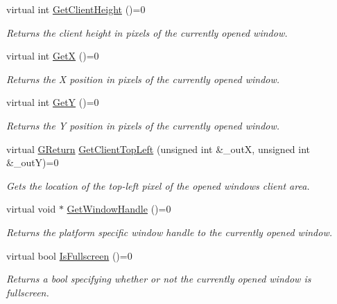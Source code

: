 \begin{DoxyCompactItemize}
virtual int \hyperlink{classGW_1_1SYSTEM_1_1GWindow_ac0a08847a67fbb588f6a851007f465f0}{Get\+Client\+Height} ()=0
\begin{DoxyCompactList}\small\item\em Returns the client height in pixels of the currently opened window. \end{DoxyCompactList}\item 
virtual int \hyperlink{classGW_1_1SYSTEM_1_1GWindow_a085fd92d1a4f5cb131ca405dc69d28ea}{GetX} ()=0
\begin{DoxyCompactList}\small\item\em Returns the X position in pixels of the currently opened window. \end{DoxyCompactList}\item 
virtual int \hyperlink{classGW_1_1SYSTEM_1_1GWindow_a37525397599eb9fc9fced0fe3a69fc04}{GetY} ()=0
\begin{DoxyCompactList}\small\item\em Returns the Y position in pixels of the currently opened window. \end{DoxyCompactList}\item 
virtual \hyperlink{namespaceGW_a67a839e3df7ea8a5c5686613a7a3de21}{G\+Return} \hyperlink{classGW_1_1SYSTEM_1_1GWindow_ac80bfaba809d5eb54d6a11b11deddeb7}{Get\+Client\+Top\+Left} (unsigned int \&\+\_\+outX, unsigned int \&\+\_\+outY)=0
\begin{DoxyCompactList}\small\item\em Gets the location of the top-\/left pixel of the opened window\textquotesingle{}s client area. \end{DoxyCompactList}\item 
virtual void $\ast$ \hyperlink{classGW_1_1SYSTEM_1_1GWindow_aa3cc3af1805ac9573424f8815420e9c5}{Get\+Window\+Handle} ()=0
\begin{DoxyCompactList}\small\item\em Returns the platform specific window handle to the currently opened window. \end{DoxyCompactList}\item 
virtual bool \hyperlink{classGW_1_1SYSTEM_1_1GWindow_acf85e727f26eeeeb3e006947c45d04a3}{Is\+Fullscreen} ()=0
\begin{DoxyCompactList}\small\item\em Returns a bool specifying whether or not the currently opened window is fullscreen. \end{DoxyCompactList}\end{DoxyCompactItemize}


